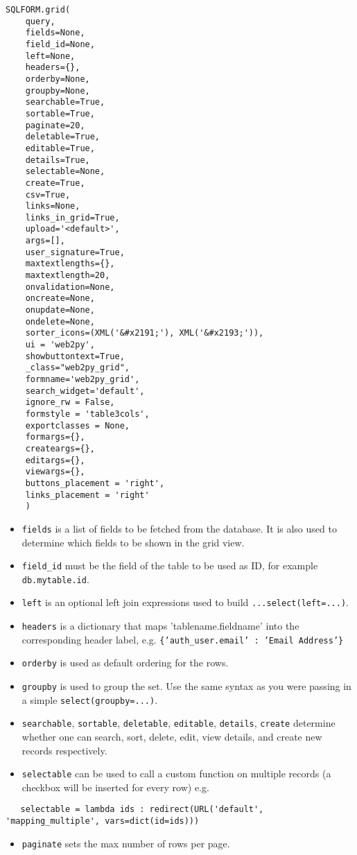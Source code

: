 \documentclass[justified,sixbynine,notoc]{tufte-book}
\def\ft{\small\tt}
\begin{document}
\begin{fullwidth}
\begin{lstlisting}
SQLFORM.grid(
    query,
    fields=None,
    field_id=None,
    left=None,
    headers={},
    orderby=None,
    groupby=None,
    searchable=True,
    sortable=True,
    paginate=20,
    deletable=True,
    editable=True,
    details=True,
    selectable=None,
    create=True,
    csv=True,
    links=None,
    links_in_grid=True,
    upload='<default>',
    args=[],
    user_signature=True,
    maxtextlengths={},
    maxtextlength=20,
    onvalidation=None,
    oncreate=None,
    onupdate=None,
    ondelete=None,
    sorter_icons=(XML('&#x2191;'), XML('&#x2193;')),
    ui = 'web2py',
    showbuttontext=True,
    _class="web2py_grid",
    formname='web2py_grid',
    search_widget='default',
    ignore_rw = False,
    formstyle = 'table3cols',
    exportclasses = None,
    formargs={},
    createargs={},
    editargs={},
    viewargs={},
    buttons_placement = 'right',
    links_placement = 'right'
    )
\end{lstlisting}

\begin{itemize}
\item {\ft fields} is a list of fields to be fetched from the database. It is also used to determine which fields to be shown in the grid view.

\item {\ft field\_id} must be the field of the table to be used as ID, for example {\ft db.mytable.id}.

\item {\ft left} is an optional left join expressions used to build {\ft ...select(left=...)}.

\item {\ft headers} is a dictionary that maps 'tablename.fieldname' into the corresponding header label, e.g. {\ft \{'auth\_user.email' : 'Email Address'\}}

\item {\ft orderby} is used as default ordering for the rows.

\item {\ft groupby} is used to group the set. Use the same syntax as you were passing in a simple {\ft select(groupby=...)}.

\item {\ft searchable}, {\ft sortable}, {\ft deletable}, {\ft editable}, {\ft details}, {\ft create} determine whether one can search, sort, delete, edit, view details, and create new records respectively.

\item {\ft selectable} can be used to call a custom function on multiple records (a checkbox will be inserted for every row) e.g.
\end{itemize}
\begin{lstlisting}
   selectable = lambda ids : redirect(URL('default', 'mapping_multiple', vars=dict(id=ids)))
\end{lstlisting}
\begin{itemize}
\item {\ft paginate} sets the max number of rows per page.


\end{itemize}
\end{fullwidth}
\end{document}
